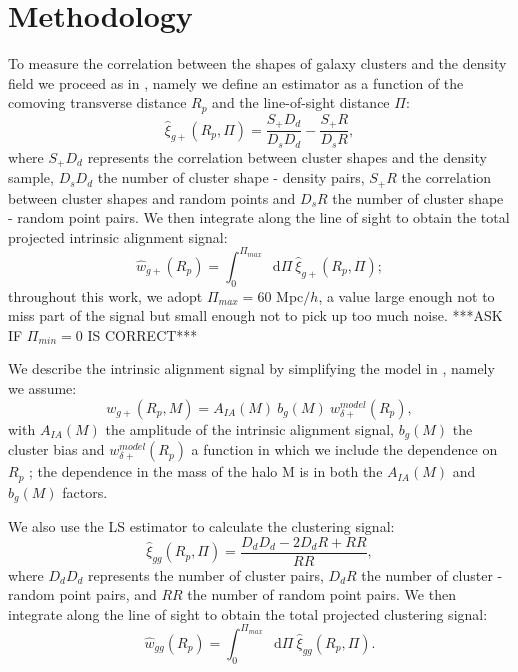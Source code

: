 \documentclass[a4paper,fleqn,usenatbib]{mnras}
\newcommand*\dif{\mathop{}\!\mathrm{d}} 	%
\begin{document}
\section{Methodology}
\label{sec:method}
To measure the correlation between the shapes of galaxy clusters and the density field we proceed as in \citet{vanUitertJoachimi2017}, namely we define an estimator as a function of the comoving transverse distance $R_p$ and the line-of-sight distance $\Pi$:
\begin{equation}
    \hat{\xi}_{g+}(R_p, \Pi) = \frac{S_+ D_d}{D_s D_d}-\frac{S_+ R}{D_s R},
	\label{eq:xigphat}
\end{equation}
where $S_+ D_d$ represents the correlation between cluster shapes and the density sample, $D_s D_d$ the number of cluster shape - density pairs, $S_+ R$ the correlation between cluster shapes and random points and $D_s R$ the number of cluster shape - random point pairs. We then integrate along the line of sight to obtain the total projected intrinsic alignment signal:
\begin{equation}
   \hat{w}_{g+} (R_p) = \int _0 ^{\Pi_{max}} \dif \Pi \ \hat{\xi}_{g+}(R_p, \Pi);
	\label{eq:wgphat}
\end{equation}
throughout this work, we adopt $\Pi_{max} = 60 $ Mpc$/h$, a value large enough not to miss part of the signal but small enough not to pick up too much noise. ***ASK IF $\Pi_{min} = 0$ IS CORRECT***

We describe the intrinsic alignment signal by simplifying the model in \citet{vanUitertJoachimi2017}, namely we assume:
\begin{equation}
    w_{g+} (R_p, M)=A_{IA} (M) \ b_g (M)\ w_{\delta +}^{model} (R_p), 
	\label{eq:wgp}
\end{equation}
with $A_{IA} (M)$ the amplitude of the intrinsic alignment signal, $b_g (M)$ the cluster bias and $w_{\delta +}^{model} (R_p)$ a function in which we include the dependence on $R_p$  \citep[equation 5]{vanUitertJoachimi2017}; the dependence in the mass of the halo M is in both the $A_{IA} (M)$ and $b_g (M)$ factors.

We also use the LS \citep{LandySzalay1993} estimator to calculate the clustering signal:
\begin{equation}
    \hat{\xi}_{gg}(R_p, \Pi) = \frac{D_dD_d -2D_dR + RR}{RR},
	\label{eq:xigghat}
\end{equation}
where $D_dD_d$ represents the number of cluster pairs, $D_dR$ the number of cluster - random point pairs, and $RR$ the number of random point pairs. We then integrate along the line of sight to obtain the total projected clustering signal:
\begin{equation}
   \hat{w}_{gg} (R_p) = \int _0 ^{\Pi_{max}} \dif \Pi \ \hat{\xi}_{gg}(R_p, \Pi).
	\label{eq:wgghat}
\end{equation}
\end{document}
